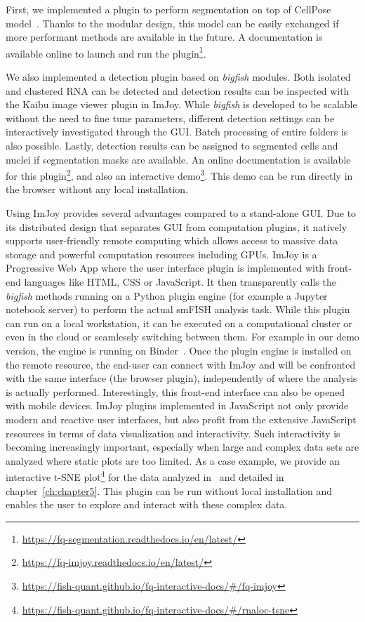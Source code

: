 First, we implemented a plugin to perform segmentation on top of CellPose model~\cite{stringer_cellpose_2021}.
Thanks to the modular design, this model can be easily exchanged if more performant methods are available in the future.
A documentation is available online to launch and run the plugin\footnote{\url{https://fq-segmentation.readthedocs.io/en/latest/}}.

We also implemented a detection plugin based on \emph{bigfish} modules.
Both isolated and clustered \ac{RNA} can be detected and detection results can be inspected with the Kaibu image viewer plugin in ImJoy.
While \emph{bigfish} is developed to be scalable without the need to fine tune parameters, different detection settings can be interactively investigated through the \ac{GUI}.
Batch processing of entire folders is also possible.
Lastly, detection results can be assigned to segmented cells and nuclei if segmentation masks are available.
An online documentation is available for this plugin\footnote{\url{https://fq-imjoy.readthedocs.io/en/latest/}}, and also an interactive demo\footnote{\url{https://fish-quant.github.io/fq-interactive-docs/\#/fq-imjoy}}.
This demo can be run directly in the browser without any local installation.

Using ImJoy provides several advantages compared to a stand-alone \ac{GUI}.
Due to its distributed design that separates \ac{GUI} from computation plugins, it natively supports user-friendly remote computing which allows access to massive data storage and powerful computation resources including GPUs.
ImJoy is a Progressive Web App where the user interface plugin is implemented with front-end languages like HTML, CSS or JavaScript.
It then transparently calls the \emph{bigfish} methods running on a Python plugin engine (for example a Jupyter notebook server) to perform the actual \ac{smFISH} analysis task.
While this plugin can run on a local workstation, it can be executed on a computational cluster or even in the cloud or seamlessly switching between them.
For example in our demo version, the engine is running on Binder~\cite{Jupyter2018Binder2}.
Once the plugin engine is installed on the remote resource, the end-user can connect with ImJoy and will be confronted with the same interface (the browser plugin), independently of where the analysis is actually performed.
Interestingly, this front-end interface can also be opened with mobile devices.
ImJoy plugins implemented in JavaScript not only provide modern and reactive user interfaces, but also profit from the extensive JavaScript resources in terms of data visualization and interactivity.
Such interactivity is becoming increasingly important, especially when large and complex data sets are analyzed where static plots are too limited.
As a case example, we provide an interactive t-SNE plot\footnote{\url{https://fish-quant.github.io/fq-interactive-docs/\#/rnaloc-tsne}} for the data analyzed in~\cite{CHOUAIB_2020} and detailed in chapter~\ref{ch:chapter5}.
This plugin can be run without local installation and enables the user to explore and interact with these complex data.

